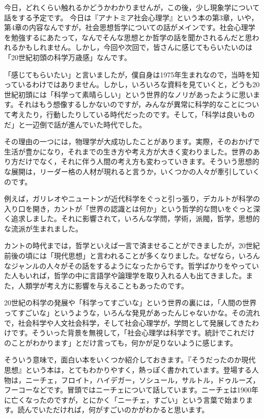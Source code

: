 \documentclass{ltjsbook}
\begin{document}
今日，どれくらい触れるかどうかわかりませんが，この後，少し現象学について話をする予定です。
今日は『アナトミア社会心理学』という本\parencite{anatomia}の第3章，いや，第4章の内容なんですが，社会思想哲学についての話がメインです。社会心理学を勉強するにあたって，なんでそんな思想とか哲学の話を聞かされるんだと思われるかもしれません。しかし，今回や次回で，皆さんに感じてもらいたいのは「20世紀初頭の科学万歳感」なんです。

「感じてもらいたい」と言いましたが，僕自身は1975年生まれなので，当時を知っているわけではありません。しかし，いろいろな資料を見ていくと，どうも20世紀初頭には「科学って素晴らしい」という世界的なノリがあったように思います。それはもう想像するしかないのですが，みんなが異常に科学的なことについて考えたり，行動したりしている時代だったのです。そして，「科学は良いものだ」と一辺倒で話が進んでいた時代でした。

その理由の一つには，物理学が大成功したことがあります。実際，そのおかげで生活が豊かになり，それまでの生き方や考え方が大きく変わりました。世界のあり方だけでなく，それに伴う人間の考え方も変わっていきます。そういう思想的な展開は，リーダー格の人材が現れると言うか，いくつかの人々が牽引していくのです。

例えば，ガリレオやニュートンが近代科学をぐっと引っ張り，デカルトが科学の入り口を開き，カントが「世界の認識とは何か」という哲学的な問いをぐっと深く追求しました。それに影響されて，いろんな学問，学術，派閥，哲学，思想的な流派が生まれました。

カントの時代までは，哲学といえば一言で済ませることができましたが，20世紀前後の頃には「現代思想」と言われることが多くなりました。なぜなら，いろんなジャンルの人々がその話をするようになったからです。哲学ばかりをやっていた人もいれば，哲学の中に言語学や論理学を取り入れる人も出てきました。また，人類学が考え方に影響を与えることもあったのです。

20世紀の科学の発展や「科学ってすごいな」という世界の裏には，「人間の世界ってすごいな」というような，いろんな発見があったんじゃないかな。その流れで，社会科学や人文社会科学，そして社会心理学が，学問として発展してきたわけです。そういった背景を無視して，「社会心理学は科学です。統計でこれだけのことがわかります」とだけ言っても，何かが足りないように感じます。

そういう意味で，面白い本をいくつか紹介しておきます。『そうだったのか現代思想』という本\parencite{kosakashuhei2000}は，とてもわかりやすく，熱っぽく書かれています。登場する人物は，ニーチェ，フロイト，ハイデガー，ソシュール，サルトル，ドゥルーズ，フーコーなどです。冒頭ではニーチェについて話しています。ニーチェは1900年に亡くなったのですが，とにかく「ニーチェ，すごい」という言葉で始まります。読んでいただければ，何がすごいのかがわかると思います。
\end{document}
